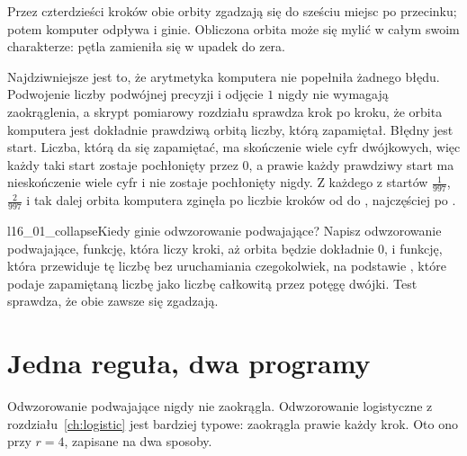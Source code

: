 
\noindent
Przez czterdzieści kroków obie orbity zgadzają się do sześciu miejsc po
przecinku; potem komputer odpływa i ginie. Obliczona orbita może się mylić
w całym swoim charakterze: pętla zamieniła się w upadek do zera.

Najdziwniejsze jest to, że arytmetyka komputera nie popełniła żadnego błędu.
Podwojenie liczby podwójnej precyzji i odjęcie $1$ nigdy nie wymagają
zaokrąglenia, a skrypt pomiarowy rozdziału sprawdza krok po kroku, że orbita
komputera jest dokładnie prawdziwą orbitą liczby, którą zapamiętał. Błędny
jest start. Liczba, którą da się zapamiętać, ma skończenie wiele cyfr
dwójkowych, więc każdy taki start zostaje pochłonięty przez $0$, a prawie
każdy prawdziwy start ma nieskończenie wiele cyfr i nie zostaje pochłonięty
nigdy. Z każdego
z  startów $\tfrac{1}{997}$, $\tfrac{2}{997}$ i tak
dalej orbita komputera zginęła po liczbie kroków od 
do , najczęściej po .


\begin{lab}{l16_01_collapse}{Kiedy ginie odwzorowanie podwajające?}
Napisz odwzorowanie podwajające, funkcję, która liczy kroki, aż orbita
będzie dokładnie $0$, i funkcję, która przewiduje tę liczbę bez uruchamiania
czegokolwiek, na podstawie , które podaje
zapamiętaną liczbę jako liczbę całkowitą przez potęgę dwójki. Test
sprawdza, że obie zawsze się zgadzają.
\end{lab}

\section{Jedna reguła, dwa programy}
\label{sec:ch16-formulas}

\noindent
Odwzorowanie podwajające nigdy nie zaokrągla. Odwzorowanie logistyczne z
rozdziału~\ref{ch:logistic} jest bardziej typowe: zaokrągla prawie każdy
krok. Oto ono przy $r = 4$, zapisane na dwa sposoby.


